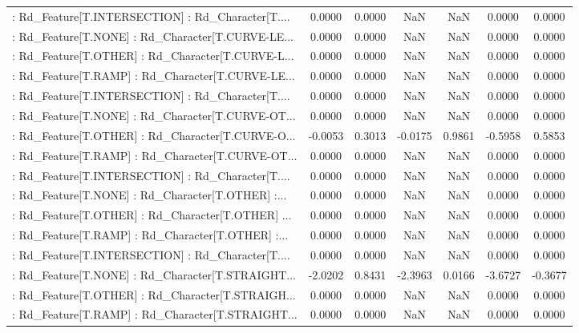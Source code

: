 \begin{longtable}{p{4cm}cccccc}
 : Rd\_Feature[T.INTERSECTION] : Rd\_Character[T.... &  0.0000 &    0.0000 &     NaN &          NaN &  0.0000 &  0.0000 \\
 : Rd\_Feature[T.NONE] : Rd\_Character[T.CURVE-LE... &  0.0000 &    0.0000 &     NaN &          NaN &  0.0000 &  0.0000 \\
 : Rd\_Feature[T.OTHER] : Rd\_Character[T.CURVE-L... &  0.0000 &    0.0000 &     NaN &          NaN &  0.0000 &  0.0000 \\
 : Rd\_Feature[T.RAMP] : Rd\_Character[T.CURVE-LE... &  0.0000 &    0.0000 &     NaN &          NaN &  0.0000 &  0.0000 \\
 : Rd\_Feature[T.INTERSECTION] : Rd\_Character[T.... &  0.0000 &    0.0000 &     NaN &          NaN &  0.0000 &  0.0000 \\
 : Rd\_Feature[T.NONE] : Rd\_Character[T.CURVE-OT... &  0.0000 &    0.0000 &     NaN &          NaN &  0.0000 &  0.0000 \\
 : Rd\_Feature[T.OTHER] : Rd\_Character[T.CURVE-O... & -0.0053 &    0.3013 & -0.0175 &       0.9861 & -0.5958 &  0.5853 \\
 : Rd\_Feature[T.RAMP] : Rd\_Character[T.CURVE-OT... &  0.0000 &    0.0000 &     NaN &          NaN &  0.0000 &  0.0000 \\
 : Rd\_Feature[T.INTERSECTION] : Rd\_Character[T.... &  0.0000 &    0.0000 &     NaN &          NaN &  0.0000 &  0.0000 \\
 : Rd\_Feature[T.NONE] : Rd\_Character[T.OTHER] :... &  0.0000 &    0.0000 &     NaN &          NaN &  0.0000 &  0.0000 \\
 : Rd\_Feature[T.OTHER] : Rd\_Character[T.OTHER] ... &  0.0000 &    0.0000 &     NaN &          NaN &  0.0000 &  0.0000 \\
 : Rd\_Feature[T.RAMP] : Rd\_Character[T.OTHER] :... &  0.0000 &    0.0000 &     NaN &          NaN &  0.0000 &  0.0000 \\
 : Rd\_Feature[T.INTERSECTION] : Rd\_Character[T.... &  0.0000 &    0.0000 &     NaN &          NaN &  0.0000 &  0.0000 \\
 : Rd\_Feature[T.NONE] : Rd\_Character[T.STRAIGHT... & -2.0202 &    0.8431 & -2.3963 &       0.0166 & -3.6727 & -0.3677 \\
 : Rd\_Feature[T.OTHER] : Rd\_Character[T.STRAIGH... &  0.0000 &    0.0000 &     NaN &          NaN &  0.0000 &  0.0000 \\
 : Rd\_Feature[T.RAMP] : Rd\_Character[T.STRAIGHT... &  0.0000 &    0.0000 &     NaN &          NaN &  0.0000 &  0.0000 \\

\end{longtable}
